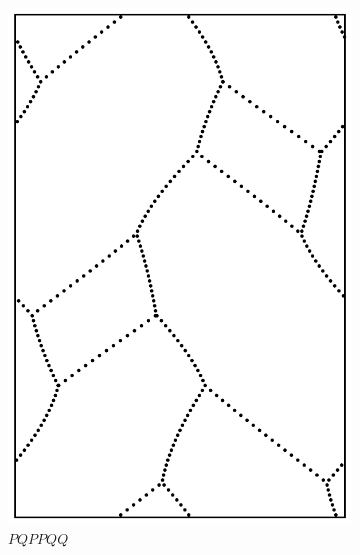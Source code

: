 \documentclass[12pt,twoside]{reedthesis}
\theoremstyle{definition}
\begin{document}
\begin{figure}[h]
  \centering
  \begin{subfigure}[t]{0.24\textwidth}
    \includegraphics[width=\textwidth]{figures/string_cheese_appendix/pqppqq.pdf}
    \caption*{$PQPPQQ$}
    \vspace{5mm}
  \end{subfigure}
  \hfill
  \begin{subfigure}[t]{0.24\textwidth}

\end{subfigure}
\end{figure}
\end{document}
